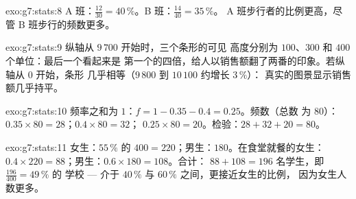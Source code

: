 \begin{solution}{exo:g7:stats:8}
A 班：$\frac{12}{30} = 40\,\%$。B 班：$\frac{14}{40} = 35\,\%$。
A 班步行者的比例更高，尽管
B 班步行的频数更多。
\end{solution}

\begin{solution}{exo:g7:stats:9}
纵轴从 $9\,700$ 开始时，三个条形的可见
高度分别为 $100$、$300$ 和 $400$ 个单位：最后一个看起来是
第一个的四倍，给人以销售额翻了两番的印象。若纵轴从 $0$ 开始，条形
几乎相等（$9\,800$ 到 $10\,100$ 约增长 $3\,\%$）：
真实的图景显示销售额几乎持平。
\end{solution}

\begin{solution}{exo:g7:stats:10}
频率之和为 $1$：$f = 1 - 0.35 - 0.4 = 0.25$。频数（总数
为 $80$）：$0.35 \times 80 = 28$；$0.4 \times 80 = 32$；
$0.25 \times 80 = 20$。检验：$28 + 32 + 20 = 80$。
\end{solution}

\begin{solution}{exo:g7:stats:11}
女生：$55\,\%$ 的 $400 = 220$；男生：$180$。在食堂就餐的女生：
$0.4 \times 220 = 88$；男生：$0.6 \times 180 = 108$。合计：
$88 + 108 = 196$ 名学生，即 $\frac{196}{400} = 49\,\%$ 的
学校 --- 介于 $40\,\%$ 与 $60\,\%$ 之间，更接近女生的比例，
因为女生人数更多。
\end{solution}

